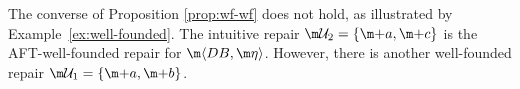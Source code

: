 \begin{example}\label{ex:wf:wf}
  The converse of Proposition \ref{prop:wf-wf} does not hold, as illustrated by Example~\ref{ex:well-founded}.
  The intuitive repair $\UU_2 = \{ \add a, \add c\}$ is the AFT-well-founded repair for $\fulldb$.
  However, there is another well-founded repair $\UU_1 = \{  \add a ,\add b\}$.
\end{example}

% 
% 

